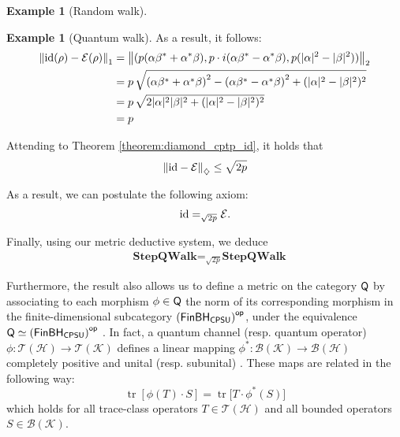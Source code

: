 \documentclass[10pt,a4paper]{amsart}
\theoremstyle{definition}
\theoremstyle{definition}
\newtheorem{example}[definition]{Example}
\theoremstyle{definition}
\theoremstyle{definition}
\theoremstyle{definition}
\theoremstyle{definition}
\begin{document}
\begin{example}[Random walk]
\begin{example} [Quantum walk]
As a result, it follows:
\begin{align*}
  \left\lVert \mathrm{id} (\rho) - \mathcal{E}(\rho) \right\rVert_{1} &= \left\lVert (p(\alpha \beta^{*} + \alpha^{*} \beta), p \cdot i(\alpha \beta^{*} - \alpha^{*} \beta) , p( |\alpha|^2-|\beta|^2)) \right\rVert_{2} \\
  & = p \, \sqrt{\left(\alpha \beta^{*} + \alpha^{*} \beta \right)^2-\left(\alpha \beta^{*} - \alpha^{*} \beta \right)^2 + (|\alpha|^2-|\beta|^2)^2} \\
  & = p \, \sqrt{2|\alpha|^2|\beta|^2 + (|\alpha|^2-|\beta|^2)^2} \\
  & = p 
\end{align*}



Attending to Theorem \ref{theorem:diamond_cptp_id}, it holds that
\begin{align*}
  \left\lVert  \mathrm{id} - \mathcal{E} \right\rVert_{\diamondsuit} \leq \sqrt{2p}
\end{align*}

As a result, we can postulate the following axiom:
    \begin{align*} 
        \mathrm{id} =_{\sqrt{2p}} \mathcal{E}.
    \end{align*}

 Finally, using our metric deductive system, we deduce
\begin{align*}
  &\textbf{StepQWalk}=_{\sqrt{2p}} \textbf{StepQWalk}
\end{align*}


\end{example}


Furthermore, the result also allows us to define a metric on the category $\mathsf{Q}$ by associating to each morphism $\phi \in \mathsf{Q}$ the norm of its corresponding morphism in the finite-dimensional subcategory $\left(\mathsf{FinBH_{CPSU}}\right)^{\mathsf{op}}$, under the equivalence $\mathsf{Q} \simeq \left(\mathsf{FinBH_{CPSU}}\right)^{\mathsf{op}}$ \cite{choSemanticsQuantumProgramming2016}. In fact, a quantum channel (resp. quantum operator) $\phi: \mathcal{T}(\mathcal{H})  \to \mathcal{T}(\mathcal{K})$ defines a linear mapping 
$\phi^*: \mathcal{B}(\mathcal{K}) \to \mathcal{B}(\mathcal{H})$ completely positive and unital (resp. subunital) 
\cite[4.1.2]{heinosaariMathematicalLanguageQuantum2011}. These maps are related in the following way:
\begin{equation*}
\operatorname{tr}[\phi(T) \cdot S] = \operatorname{tr}\big[T \cdot \phi^*(S)\big]
\end{equation*}
which holds for all trace-class operators $T \in \mathcal{T}(\mathcal{H})$ and all bounded operators $S \in \mathcal{B}(\mathcal{K})$.


\end{example}
\end{document}
